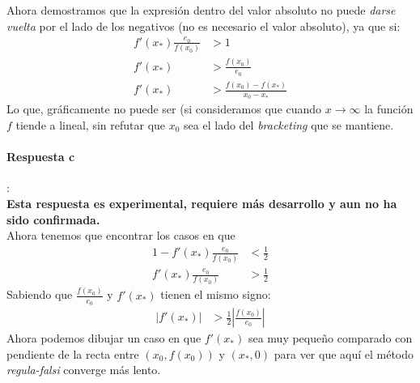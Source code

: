 \documentclass[spanish, fleqn]{article}
\begin{document}
\begin{enumerate}
Ahora demostramos que la expresión dentro del valor absoluto no puede \emph{darse vuelta} por el lado de los negativos (no es necesario el valor absoluto), ya que si:
\begin{align*}
f'(x_*)\frac{e_0}{f(x_0)} &> 1 \\
f'(x_*) &> \frac{f(x_0)}{e_0} \\
f'(x_*) &> \frac{f(x_0)-f(x_*)}{x_0-x_*}
\end{align*}
Lo que, gráficamente no puede ser (si consideramos que cuando $x\rightarrow \infty$ la función $f$ tiende a lineal, sin refutar que $x_0$ sea el lado del \emph{bracketing} que se mantiene.
\paragraph{Respuesta c}: \\ \textbf{Esta respuesta es experimental, requiere más desarrollo y aun no ha sido confirmada.} \\ Ahora tenemos que encontrar los casos en que
\begin{align*}
1 - f'(x_*)\frac{e_0}{f(x_0)} &< \frac{1}{2}
\\f'(x_*)\frac{e_0}{f(x_0)} &> \frac{1}{2}
\end{align*}
Sabiendo que $\frac{f(x_0)}{e_0}$ y $f'(x_*)$ tienen el mismo signo:
\begin{align*}
|f'(x_*)| &> \frac{1}{2}\left| \frac{f(x_0)}{e_0} \right|
\end{align*}
Ahora podemos dibujar un caso en que $f'(x_*)$ sea muy pequeño comparado con pendiente de la recta entre $(x_0,f(x_0))$ y $(x_*,0)$ para ver que aquí el método \emph{regula-falsi} converge más lento.
\end{enumerate}
\end{document}
